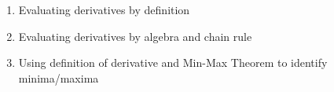 \documentclass[12pt]{amsart}
\begin{document}
\begin{enumerate}
	\item Evaluating derivatives by definition
	

	\item Evaluating derivatives by algebra and chain rule
	\item Using definition of derivative and Min-Max Theorem to identify minima/maxima
			\begin{comment}
	\item Using definition of derivative and mean value theorem to determine increasing / decreasing behavior of functions
\end{comment}

\end{enumerate}
\end{document}
